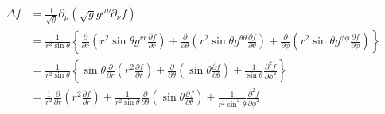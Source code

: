\documentclass[12pt]{ujarticle}
\begin{document}
\begin{align}
\Delta f &= \frac{1}{\sqrt{g}}\partial_{\mu}\left(\sqrt{g}g^{\mu\nu}\partial_{\nu}f\right) \\
&= \frac{1}{r^2\sin\theta}\left\{\frac{\partial}{\partial r}\left(r^2\sin\theta g^{rr}\frac{\partial f}{\partial r}\right) + \frac{\partial}{\partial\theta}\left(r^2\sin\theta g^{\theta\theta}\frac{\partial f}{\partial \theta}\right) + \frac{\partial}{\partial \phi}\left(r^2\sin\theta g^{\phi\phi}\frac{\partial f}{\partial \phi}\right)\right\} \\
&= \frac{1}{r^2\sin\theta}\left\{\sin\theta\frac{\partial}{\partial r}\left(r^2\frac{\partial f}{\partial r}\right) + \frac{\partial}{\partial \theta}\left(\sin\theta\frac{\partial f}{\partial \theta}\right) + \frac{1}{\sin\theta}\frac{\partial^2 f}{\partial \phi^2} \right\} \\
&= \frac{1}{r^2}\frac{\partial}{\partial r}\left(r^2\frac{\partial f}{\partial r}\right) + \frac{1}{r^2\sin\theta}\frac{\partial}{\partial \theta}\left(\sin\theta\frac{\partial f}{\partial \theta}\right) + \frac{1}{r^2\sin^2\theta}\frac{\partial^2 f}{\partial \phi^2}
\end{align}
\end{document}
